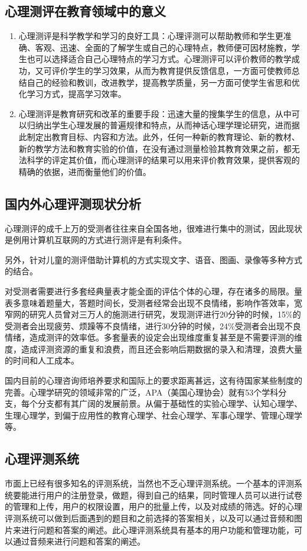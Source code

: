 \subsection{心理测评在教育领域中的意义}

\begin{enumerate}
\item 心理测评是科学教学和学习的良好工具：心理评测可以帮助教师和学生更准确、客观、迅速、全面的了解学生或自己的心理特点，教师便可因材施教，学生也可以选择适合自己心理特点的学习方式。心理测评可以评价教师的教学成功，又可评价学生的学习效果，从而为教育提供反馈信息，一方面可使教师总结自己的经验和教训，改进教学，提高教学质量，另一方面可使学生省思和优化学习方式，提高学习效率。
\item 心理测评是教育研究和改革的重要手段：迅速大量的搜集学生的信息，从中可以归纳出学生心理发展的普遍规律和特点，从而神话心理学理论研究，进而据此制定出教育目标、内容和方法。此外，任何一种新的教育理论、新的教材、新的教学方法和教育实验的价值，在没有通过测量检验其教育效果之前，都无法科学的评定其价值，而心理测评的结果可以用来评价教育效果，提供客观的精确的依据，进而衡量他们的价值。
\end{enumerate}

\subsection{国内外心理评测现状分析}

心理测评的成千上万的受测者往往来自全国各地，很难进行集中的测试，因此现状是例用计算机互联网的方式进行测评是有利条件。

另外，针对儿童的测评借助计算机的方式实现文字、语音、图画、录像等多种方式的结合。

对受测者需要进行多套经典量表才能全面的评估个体的心理，存在诸多的局限。量表多意味着题量大，答题时间长，受测者经常会出现不良情绪，影响作答效率，宽窄网的研究人员曾对三万人的施测进行研究，发现测评进行20分钟的时候，15\%的受测者会出现疲劳、烦躁等不良情绪，进行30分钟的时候，24\%受测者会出现不良情绪，造成测评的效率低。多套量表的设定会出现维度重复甚至是不需要评测的维度，造成评测资源的重复和浪费，而且还会影响后期数据的录入和清理，浪费大量的时间和人工成本。

国内目前的心理咨询师培养要求和国际上的要求距离甚远，这有待国家某些制度的完善。心理学研究的领域非常的广泛，APA（美国心理协会）就有53个学科分支，每个分支都有其广阔的发展前景。从偏于基础性的实验心理学、认知心理学、生理心理学，到偏于应用性的教育心理学、社会心理学、军事心理学、管理心理学等。

\subsection{心理评测系统}

市面上已经有很多知名的评测系统，当然也不乏心理评测系统。一个基本的评测系统要能进行用户的注册登录，做题，得到自己的结果，同时管理人员可以进行试卷的管理和上传，用户的权限设置，用户的批量上传，以及对成绩的筛选。好的心理评测系统可以做到后面遇到的题目和之前选择的答案相关，以及可以通过音频和图片来进行问题和答案的阐述。此心理评测系统具有基本的用户功能和管理功能，可以通过音频来进行问题和答案的阐述。
























